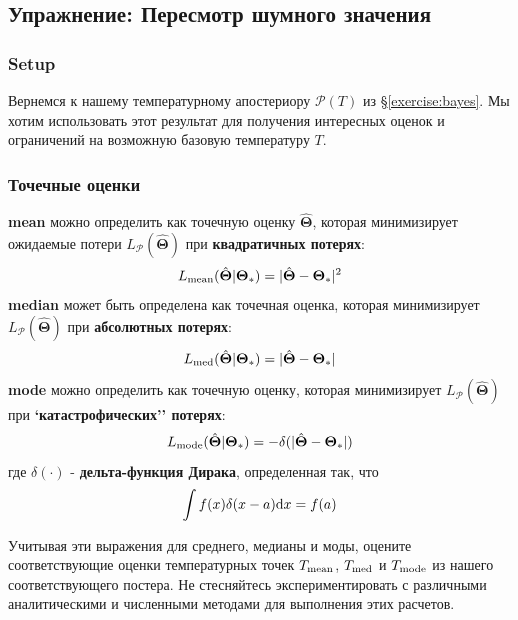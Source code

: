 \documentclass[12pt, titlepage]{article}
\newcommand{\deriv}{\ensuremath{{\rm d}}}  %
\newcommand{\params}{\ensuremath{\boldsymbol\Theta}}
\newcommand{\posterior}{\ensuremath{\mathcal{P}}}
\begin{document}
\subsection*{Упражнение: Пересмотр шумного значения} \label{exercise:practice}

\subsubsection*{Setup}

Вернемся к нашему температурному апостериору $\posterior(T)$ из \S\ref{exercise:bayes}. Мы хотим использовать этот результат для получения интересных оценок и ограничений на возможную базовую температуру $T$.

\subsubsection*{Точечные оценки}

\textbf{mean} можно определить как
точечную оценку $\hat{\params}$, которая минимизирует ожидаемые потери
$L_{\posterior}(\hat{\params})$ при \textbf{квадратичных потерях}:
\begin{equation*}
	L_{\rm mean}(\hat{\params}|\params_*) = |\hat{\params} - \params_*|^2
\end{equation*}
\textbf{median} может быть определена как точечная оценка, которая минимизирует
$L_{\posterior}(\hat{\params})$ при \textbf{абсолютных потерях}:
\begin{equation*}
	L_{\rm med}(\hat{\params}|\params_*) = |\hat{\params} - \params_*|
\end{equation*}
\textbf{mode} можно определить как точечную оценку, которая
минимизирует $L_{\posterior}(\hat{\params})$ при \textbf{`катастрофических'' потерях}:
\begin{equation*}
	L_{\rm mode}(\hat{\params}|\params_*) = -\delta(|\hat{\params}-\params_*|)
\end{equation*}
где $\delta(\cdot)$ - \textbf{дельта-функция Дирака}, определенная так, что
\begin{equation*}
	\int f(x)\delta(x-a)\deriv x = f(a)
\end{equation*}

Учитывая эти выражения для среднего, медианы и моды, оцените соответствующие оценки температурных точек $T_{\rm mean}$, $T_{\rm med}$ и $T_{\rm mode}$ из нашего соответствующего постера. Не стесняйтесь экспериментировать с различными аналитическими и численными методами для выполнения этих расчетов.
\end{document}
